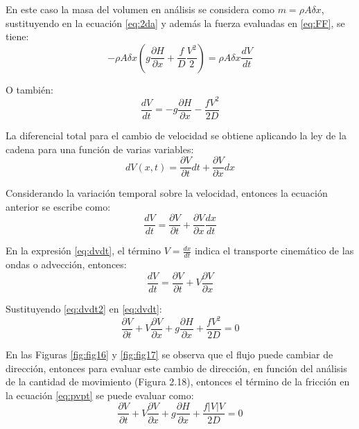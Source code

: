 \documentclass[letterpaper]{report}
\begin{document}
En este caso la masa del volumen en análisis se considera como $m=\rho A\delta x$, sustituyendo en la ecuación \ref{eq:2da} y además la fuerza evaluadas en \ref{eq:FF}, se tiene:
\begin{equation*}
	-\rho A \delta x \left( g\frac{\partial H}{\partial x} + \frac{f}{D} \frac{V^2}{2} \right) = \rho A \delta x \frac{dV}{dt}
\end{equation*}

O también:
\begin{equation}
	\frac{dV}{dt} = -g \frac{\partial H}{\partial x} - \frac{f V^2}{2D}
\end{equation}

La diferencial total para el cambio de velocidad se obtiene aplicando la ley de la cadena para una función de varias variables:
\begin{equation*}
dV(x,t) = \frac{\partial V}{\partial t} dt + \frac{\partial V}{\partial x} dx
\end{equation*}

Considerando la variación temporal sobre la velocidad, entonces la ecuación anterior se escribe como:
\begin{equation}
\frac{dV}{dt}=\frac{\partial V}{\partial t}+\frac{\partial V}{\partial x}\frac{dx}{dt}
\label{eq:dvdt}
\end{equation}

En la expresión \ref{eq:dvdt}, el término $V=\frac{dx}{dt}$ indica el transporte cinemático de las ondas o advección, entonces:
\begin{equation}
	\frac{dV}{dt}=\frac{\partial V}{\partial t}+V\frac{\partial V}{\partial x}
\label{eq:dvdt2}
\end{equation}

Sustituyendo \ref{eq:dvdt2} en \ref{eq:dvdt}:
\begin{equation}
\frac{\partial V}{\partial t}+V\frac{\partial V}{\partial x}+g\frac{\partial H}{\partial x}+\frac{fV^2}{2D}=0
\label{eq:pvpt}
\end{equation}

En las Figuras \ref{fig:fig16} y \ref{fig:fig17} se observa que el flujo puede cambiar de dirección, entonces para evaluar este cambio de 
dirección, en función del análisis de la cantidad de movimiento (Figura 2.18), entonces el término de la fricción en la ecuación 
\ref{eq:pvpt} se puede evaluar como:
\begin{equation}
\frac{\partial V}{\partial t}+V\frac{\partial V}{\partial x}+g\frac{\partial H}{\partial x}+\frac{f\left|V\right|V}{2D}=0
\label{eq:pvpt2}
\end{equation}
\end{document}
